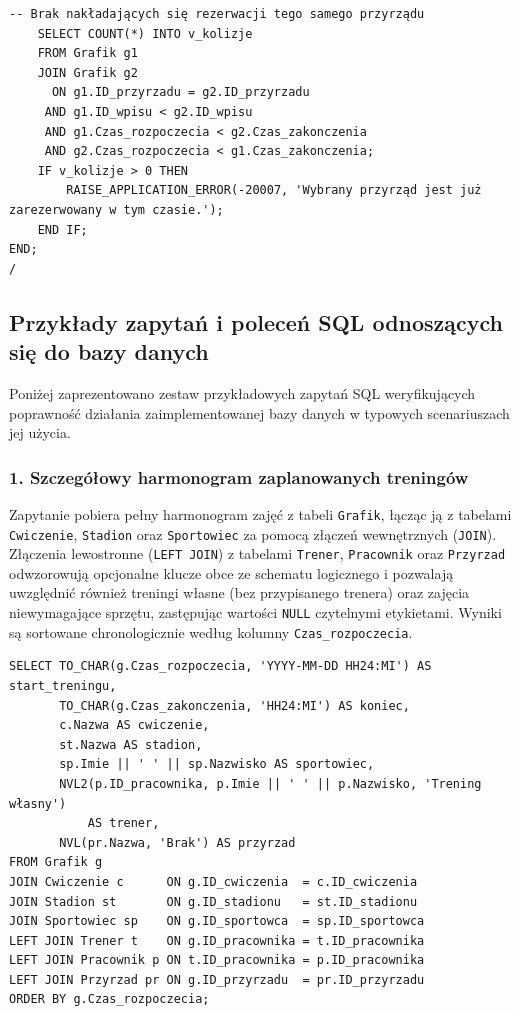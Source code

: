 \documentclass[11pt,a4paper]{article}
\begin{document}
\begin{lstlisting}[basicstyle=\ttfamily\footnotesize, caption={Poprawiony skrypt SQL tworzący strukturę bazy danych}]
    -- Brak nakładających się rezerwacji tego samego przyrządu
    SELECT COUNT(*) INTO v_kolizje
    FROM Grafik g1
    JOIN Grafik g2
      ON g1.ID_przyrzadu = g2.ID_przyrzadu
     AND g1.ID_wpisu < g2.ID_wpisu
     AND g1.Czas_rozpoczecia < g2.Czas_zakonczenia
     AND g2.Czas_rozpoczecia < g1.Czas_zakonczenia;
    IF v_kolizje > 0 THEN
        RAISE_APPLICATION_ERROR(-20007, 'Wybrany przyrząd jest już zarezerwowany w tym czasie.');
    END IF;
END;
/
\end{lstlisting}

\clearpage
\subsection{Przykłady zapytań i poleceń SQL odnoszących się do bazy danych}
Poniżej zaprezentowano zestaw przykładowych zapytań SQL weryfikujących poprawność działania zaimplementowanej bazy danych w typowych scenariuszach jej użycia.

\subsubsection*{1. Szczegółowy harmonogram zaplanowanych treningów}
Zapytanie pobiera pełny harmonogram zajęć z tabeli \texttt{Grafik}, łącząc ją z tabelami \texttt{Cwiczenie}, \texttt{Stadion} oraz \texttt{Sportowiec} za pomocą złączeń wewnętrznych (\texttt{JOIN}). Złączenia lewostronne (\texttt{LEFT JOIN}) z tabelami \texttt{Trener}, \texttt{Pracownik} oraz \texttt{Przyrzad} odwzorowują opcjonalne klucze obce ze schematu logicznego i pozwalają uwzględnić również treningi własne (bez przypisanego trenera) oraz zajęcia niewymagające sprzętu, zastępując wartości \texttt{NULL} czytelnymi etykietami. Wyniki są sortowane chronologicznie według kolumny \texttt{Czas\_rozpoczecia}.

\begin{lstlisting}[caption={Szczegółowy harmonogram zaplanowanych sesji treningowych}]
SELECT TO_CHAR(g.Czas_rozpoczecia, 'YYYY-MM-DD HH24:MI') AS start_treningu,
       TO_CHAR(g.Czas_zakonczenia, 'HH24:MI') AS koniec,
       c.Nazwa AS cwiczenie,
       st.Nazwa AS stadion,
       sp.Imie || ' ' || sp.Nazwisko AS sportowiec,
       NVL2(p.ID_pracownika, p.Imie || ' ' || p.Nazwisko, 'Trening własny')
           AS trener,
       NVL(pr.Nazwa, 'Brak') AS przyrzad
FROM Grafik g
JOIN Cwiczenie c      ON g.ID_cwiczenia  = c.ID_cwiczenia
JOIN Stadion st       ON g.ID_stadionu   = st.ID_stadionu
JOIN Sportowiec sp    ON g.ID_sportowca  = sp.ID_sportowca
LEFT JOIN Trener t    ON g.ID_pracownika = t.ID_pracownika
LEFT JOIN Pracownik p ON t.ID_pracownika = p.ID_pracownika
LEFT JOIN Przyrzad pr ON g.ID_przyrzadu  = pr.ID_przyrzadu
ORDER BY g.Czas_rozpoczecia;
\end{lstlisting}
\end{document}
